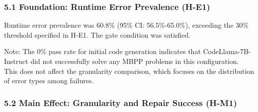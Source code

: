 
\subsubsection{5.1 Foundation: Runtime Error Prevalence (H-E1)}

\begin{table}[htbp]
\centering
{}
\end{table}

Runtime error prevalence was 60.8\% (95\% CI: 56.5\%-65.0\%), exceeding the 30\% threshold specified in H-E1. The gate condition was satisfied.

Note: The 0\% pass rate for initial code generation indicates that CodeLlama-7B-Instruct did not successfully solve any MBPP problems in this configuration. This does not affect the granularity comparison, which focuses on the distribution of error types among failures.

\subsubsection{5.2 Main Effect: Granularity and Repair Success (H-M1)}

\begin{table}[htbp]
\centering
{}
\end{table}

